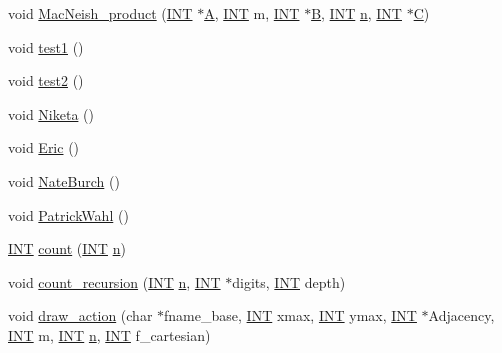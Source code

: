 \begin{DoxyCompactItemize}
\item 
void \mbox{\hyperlink{test_8_c_ae897b5b7c4cdc3f71d634b18fd1ccc96}{Mac\+Neish\+\_\+product}} (\mbox{\hyperlink{galois_8h_a09fddde158a3a20bd2dcadb609de11dc}{I\+NT}} $\ast$\mbox{\hyperlink{simeon_8_c_a97833f04c3a9c008df5521a2fc291bb4}{A}}, \mbox{\hyperlink{galois_8h_a09fddde158a3a20bd2dcadb609de11dc}{I\+NT}} m, \mbox{\hyperlink{galois_8h_a09fddde158a3a20bd2dcadb609de11dc}{I\+NT}} $\ast$\mbox{\hyperlink{costas_8_c_ad1f767566c3189fb90e9cffcc5dd4680}{B}}, \mbox{\hyperlink{galois_8h_a09fddde158a3a20bd2dcadb609de11dc}{I\+NT}} \mbox{\hyperlink{simeon_8_c_a7f2cd26777ce0ff3fdaf8d02aacbddfb}{n}}, \mbox{\hyperlink{galois_8h_a09fddde158a3a20bd2dcadb609de11dc}{I\+NT}} $\ast$\mbox{\hyperlink{costas_8_c_aacbbb35f36efadbb40803bfb5480b737}{C}})
\item 
void \mbox{\hyperlink{test_8_c_a1440a7779ac56f47a3f355ce4a8c7da0}{test1}} ()
\item 
void \mbox{\hyperlink{test_8_c_a0283886819c7c140a023582b7269e2d0}{test2}} ()
\item 
void \mbox{\hyperlink{test_8_c_ae7257418a404ff6595e48501301ce1e6}{Niketa}} ()
\item 
void \mbox{\hyperlink{test_8_c_a6ef9140cdb0e33ceaf40e9e448ae37a4}{Eric}} ()
\item 
void \mbox{\hyperlink{test_8_c_a4e0da8dc83e2511a096f7d30abf5fbd2}{Nate\+Burch}} ()
\item 
void \mbox{\hyperlink{test_8_c_a2d76029ac609fabf6fcf7883b0a7aa7c}{Patrick\+Wahl}} ()
\item 
\mbox{\hyperlink{galois_8h_a09fddde158a3a20bd2dcadb609de11dc}{I\+NT}} \mbox{\hyperlink{test_8_c_a6305520cf78b894bf9380f5102f323a0}{count}} (\mbox{\hyperlink{galois_8h_a09fddde158a3a20bd2dcadb609de11dc}{I\+NT}} \mbox{\hyperlink{simeon_8_c_a7f2cd26777ce0ff3fdaf8d02aacbddfb}{n}})
\item 
void \mbox{\hyperlink{test_8_c_a51df574411336773181102acf1afbc09}{count\+\_\+recursion}} (\mbox{\hyperlink{galois_8h_a09fddde158a3a20bd2dcadb609de11dc}{I\+NT}} \mbox{\hyperlink{simeon_8_c_a7f2cd26777ce0ff3fdaf8d02aacbddfb}{n}}, \mbox{\hyperlink{galois_8h_a09fddde158a3a20bd2dcadb609de11dc}{I\+NT}} $\ast$digits, \mbox{\hyperlink{galois_8h_a09fddde158a3a20bd2dcadb609de11dc}{I\+NT}} depth)
\item 
void \mbox{\hyperlink{test_8_c_a1bef40aefd5d924e54a3b2b8c667b618}{draw\+\_\+action}} (char $\ast$fname\+\_\+base, \mbox{\hyperlink{galois_8h_a09fddde158a3a20bd2dcadb609de11dc}{I\+NT}} xmax, \mbox{\hyperlink{galois_8h_a09fddde158a3a20bd2dcadb609de11dc}{I\+NT}} ymax, \mbox{\hyperlink{galois_8h_a09fddde158a3a20bd2dcadb609de11dc}{I\+NT}} $\ast$Adjacency, \mbox{\hyperlink{galois_8h_a09fddde158a3a20bd2dcadb609de11dc}{I\+NT}} m, \mbox{\hyperlink{galois_8h_a09fddde158a3a20bd2dcadb609de11dc}{I\+NT}} \mbox{\hyperlink{simeon_8_c_a7f2cd26777ce0ff3fdaf8d02aacbddfb}{n}}, \mbox{\hyperlink{galois_8h_a09fddde158a3a20bd2dcadb609de11dc}{I\+NT}} f\+\_\+cartesian)

\end{DoxyCompactItemize}
